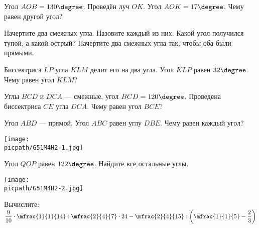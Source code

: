 %
%
\begin{homework}[number=2]
	\begin{listofex}
		\item Угол \( AOB=130\degree \). Проведён луч \( OK \). Угол \( AOK=17\degree \). Чему равен другой угол?
		\item Начертите два смежных угла. Назовите каждый из них. Какой угол получился тупой, а какой острый? Начертите два смежных угла так, чтобы оба были прямыми.
		\item Биссектриса \( LP \) угла \( KLM \) делит его на два угла. Угол \( KLP \) равен \( 32\degree \). Чему равен угол \( KLM \)?
		\item Углы \( BCD \) и \( DCA \) --- смежные, угол \( BCD=120\degree \). Проведена биссектриса \( CE \) угла \( DCA \). Чему равен угол \( BCE \)?
		 \item 
		 \item \begin{minipage}[t]{\bodywidth}
		 	Угол \( ABD \) --- прямой. Угол \( ABC \) равен углу \( DBE \). Чему равен каждый угол?
		 \end{minipage}
		 \gapwidth
		 \begin{minipage}[t]{\picwidth}
		 	\texttt{[image: \\picpath/G51M4H2-1.jpg]}
		 \end{minipage}
	 
	 
	 \item \begin{minipage}[t]{\bodywidth}
	 	Угол \( QOP \) равен \( 122\degree \). Найдите все остальные углы.
	 \end{minipage}
	 \gapwidth
	 \begin{minipage}[t]{\picwidth}
	 	\texttt{[image: \\picpath/G51M4H2-2.jpg]}
	 \end{minipage}
 		\item Вычислите:	\( \dfrac{9}{10}\cdot\mfrac{1}{1}{14}:\mfrac{2}{4}{7}\cdot24-\mfrac{2}{4}{15}:\left( \mfrac{1}{1}{5}-\dfrac{2}{3} \right) \)
	\end{listofex}
\end{homework}

